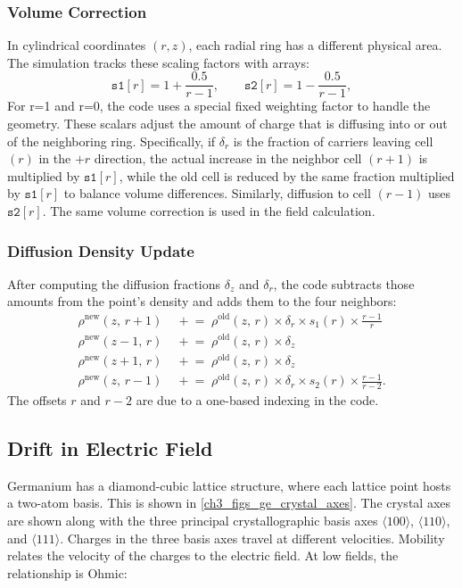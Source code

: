 \subsubsection*{Volume Correction}
In cylindrical coordinates $(r,z)$, each radial ring has a different physical area. The simulation tracks these scaling factors with arrays:
\[
\texttt{s1}[r] = 1 + \frac{0.5}{r-1}, 
\qquad
\texttt{s2}[r] = 1 - \frac{0.5}{r-1},
\] 
For r=1 and r=0, the code uses a special fixed weighting factor to handle the geometry. These scalars adjust the amount of charge that is diffusing into or out of the neighboring ring. Specifically, if $\delta_r$ is the fraction of carriers leaving cell $(r)$ in
the $+r$ direction, the actual increase in the neighbor cell
$(r+1)$ is multiplied by $\texttt{s1}[r]$, while the old cell is
reduced by the same fraction multiplied by $\texttt{s1}[r]$ to
balance volume differences. Similarly, diffusion to cell $(r-1)$ 
uses $\texttt{s2}[r]$. The same volume correction is used in the field calculation.

\subsubsection*{Diffusion Density Update}
After computing the diffusion fractions $\delta_z$ and $\delta_r$, the code subtracts those amounts from the point's density and adds them to the four neighbors:
\begin{align}
  \rho^{\mathrm{new}}(z,\,r+1) &\;\mathrel{+}= \;\rho^{\mathrm{old}}(z,\,r)\times\delta_r \times s_1(r) \times \frac{r-1}{r} \label{ch3:eq:diffusion_update_1} \\
  \rho^{\mathrm{new}}(z-1,\,r) &\;\mathrel{+}= \;\rho^{\mathrm{old}}(z,\,r)\times\delta_z \label{ch3:eq:diffusion_update_2} \\
  \rho^{\mathrm{new}}(z+1,\,r) &\;\mathrel{+}= \;\rho^{\mathrm{old}}(z,\,r)\times\delta_z \label{ch3:eq:diffusion_update_3} \\
  \rho^{\mathrm{new}}(z,\,r-1) &\;\mathrel{+}= \;\rho^{\mathrm{old}}(z,\,r) \times \delta_r \times s_2(r) \times\frac{r-1}{r-2} \label{ch3:eq:diffusion_update_4}.
\end{align}
 The offsets $r$ and $r-2$ are due to a one-based indexing in the code.
 
\subsection{Drift in Electric Field}
Germanium has a diamond-cubic lattice structure, where each lattice point hosts a two-atom basis. This is shown in \ref{ch3_figs_ge_crystal_axes}. The crystal axes are shown along with the three principal crystallographic basis axes $\langle 100\rangle$, $\langle 110\rangle$, and $\langle 111\rangle$. Charges in the three basis axes travel at different velocities. Mobility relates the velocity of the charges to the electric field. At low fields, the relationship is Ohmic:


